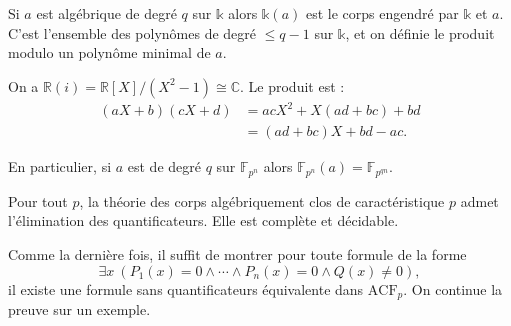 \documentclass[./main]{subfiles}
\begin{document}
  \begin{rmk}
    Si $a$ est algébrique de degré $q$ sur $\mathds{k}$ alors $\mathds{k}(a)$ est le corps engendré par $\mathds{k}$ et $a$.
    C'est l'ensemble des polynômes de degré $\le q-1$ sur $\mathds{k}$, et on définie le produit modulo un polynôme minimal de $a$.
  \end{rmk}

  \begin{exm}
    On a $\mathds{R}(i) = \mathds{R}[X] / (X^2 - 1) \cong \mathds{C}$.
    Le produit est :
    \begin{align*}
      (aX + b)(c X + d)
      &= ac X^2 + X(ad + bc) + bd \\
      &= (ad + bc) X + bd - ac
    .\end{align*}

    En particulier, si $a$ est de degré $q$ sur $\mathds{F}_{p^n}$ alors $\mathds{F}_{p^n}(a) = \mathds{F}_{p^{qn}}$.
  \end{exm}

  \begin{thm}
    Pour tout $p$, la théorie des corps algébriquement clos de caractéristique $p$ admet l'élimination des quantificateurs. Elle est complète et décidable.
  \end{thm}
  \begin{prv}
    Comme la dernière fois, il suffit de montrer pour toute formule de la forme \[
      \exists x \: (P_1(x) = 0 \land \cdots \land P_n(x) = 0 \land Q(x) \neq 0)
    ,\]
    il existe une formule sans quantificateurs équivalente dans $\mathrm{ACF}_p$.
    On continue la preuve sur un exemple.
  \end{prv}
\end{document}
